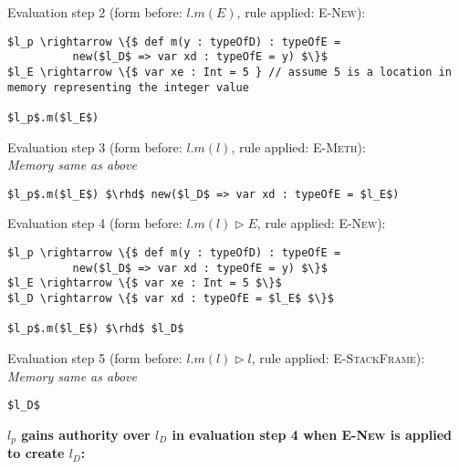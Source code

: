 \documentclass{llncs}
\begin{document}
\vspace{12pt}
\noindent Evaluation step 2 (form before: $l.m(E)$, rule applied: \textsc{E-New}):
\vspace{-6pt}
\begin{lstlisting}[xleftmargin=20pt]
$l_p \rightarrow \{$ def m(y : typeOfD) : typeOfE =
          new($l_D$ => var xd : typeOfE = y) $\}$
$l_E \rightarrow \{$ var xe : Int = 5 } // assume 5 is a location in memory representing the integer value

$l_p$.m($l_E$)
\end{lstlisting}

\vspace{12pt}
\noindent Evaluation step 3 (form before: $l.m(l)$, rule applied: \textsc{E-Meth}):\\
\vspace{-6pt}
\indent\textit{Memory same as above}\\
\vspace{-6pt}
\begin{lstlisting}[xleftmargin=20pt]
$l_p$.m($l_E$) $\rhd$ new($l_D$ => var xd : typeOfE = $l_E$)
\end{lstlisting}

\vspace{12pt}
\noindent Evaluation step 4 (form before: $l.m(l) \rhd E$, rule applied: \textsc{E-New}):
\vspace{-6pt}
\begin{lstlisting}[xleftmargin=20pt]
$l_p \rightarrow \{$ def m(y : typeOfD) : typeOfE =
          new($l_D$ => var xd : typeOfE = y) $\}$
$l_E \rightarrow \{$ var xe : Int = 5 $\}$
$l_D \rightarrow \{$ var xd : typeOfE = $l_E$ $\}$

$l_p$.m($l_E$) $\rhd$ $l_D$
\end{lstlisting}

\vspace{12pt}
\noindent Evaluation step 5 (form before: $l.m(l) \rhd l$, rule applied: \textsc{E-StackFrame}):\\
\vspace{-6pt}
\indent\textit{Memory same as above}\\
\vspace{-6pt}
\begin{lstlisting}[xleftmargin=20pt]
$l_D$
\end{lstlisting}

\newpage

\noindent\textbf{$l_p$ gains authority over $l_D$ in evaluation step 4 when \textsc{E-New} is applied to create $l_D$:}\\
\end{document}
